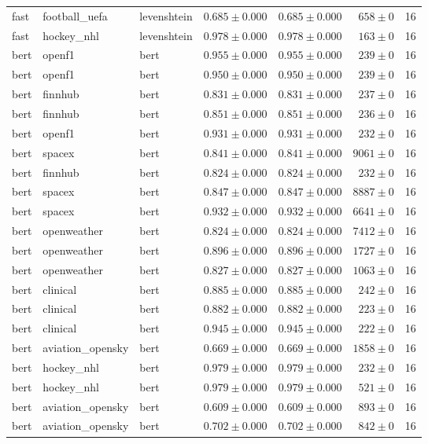 \begin{table}[htbp]
\begin{tabular}{l l l r r r r}
fast & football\_uefa & levenshtein & $0.685\pm0.000$ & $0.685\pm0.000$ & $658\pm0$ & 16 \\
fast & hockey\_nhl & levenshtein & $0.978\pm0.000$ & $0.978\pm0.000$ & $163\pm0$ & 16 \\
bert & openf1 & bert & $0.955\pm0.000$ & $0.955\pm0.000$ & $239\pm0$ & 16 \\
bert & openf1 & bert & $0.950\pm0.000$ & $0.950\pm0.000$ & $239\pm0$ & 16 \\
bert & finnhub & bert & $0.831\pm0.000$ & $0.831\pm0.000$ & $237\pm0$ & 16 \\
bert & finnhub & bert & $0.851\pm0.000$ & $0.851\pm0.000$ & $236\pm0$ & 16 \\
bert & openf1 & bert & $0.931\pm0.000$ & $0.931\pm0.000$ & $232\pm0$ & 16 \\
bert & spacex & bert & $0.841\pm0.000$ & $0.841\pm0.000$ & $9061\pm0$ & 16 \\
bert & finnhub & bert & $0.824\pm0.000$ & $0.824\pm0.000$ & $232\pm0$ & 16 \\
bert & spacex & bert & $0.847\pm0.000$ & $0.847\pm0.000$ & $8887\pm0$ & 16 \\
bert & spacex & bert & $0.932\pm0.000$ & $0.932\pm0.000$ & $6641\pm0$ & 16 \\
bert & openweather & bert & $0.824\pm0.000$ & $0.824\pm0.000$ & $7412\pm0$ & 16 \\
bert & openweather & bert & $0.896\pm0.000$ & $0.896\pm0.000$ & $1727\pm0$ & 16 \\
bert & openweather & bert & $0.827\pm0.000$ & $0.827\pm0.000$ & $1063\pm0$ & 16 \\
bert & clinical & bert & $0.885\pm0.000$ & $0.885\pm0.000$ & $242\pm0$ & 16 \\
bert & clinical & bert & $0.882\pm0.000$ & $0.882\pm0.000$ & $223\pm0$ & 16 \\
bert & clinical & bert & $0.945\pm0.000$ & $0.945\pm0.000$ & $222\pm0$ & 16 \\
bert & aviation\_opensky & bert & $0.669\pm0.000$ & $0.669\pm0.000$ & $1858\pm0$ & 16 \\
bert & hockey\_nhl & bert & $0.979\pm0.000$ & $0.979\pm0.000$ & $232\pm0$ & 16 \\
bert & hockey\_nhl & bert & $0.979\pm0.000$ & $0.979\pm0.000$ & $521\pm0$ & 16 \\
bert & aviation\_opensky & bert & $0.609\pm0.000$ & $0.609\pm0.000$ & $893\pm0$ & 16 \\
bert & aviation\_opensky & bert & $0.702\pm0.000$ & $0.702\pm0.000$ & $842\pm0$ & 16 \\

\end{tabular}
\end{table}

